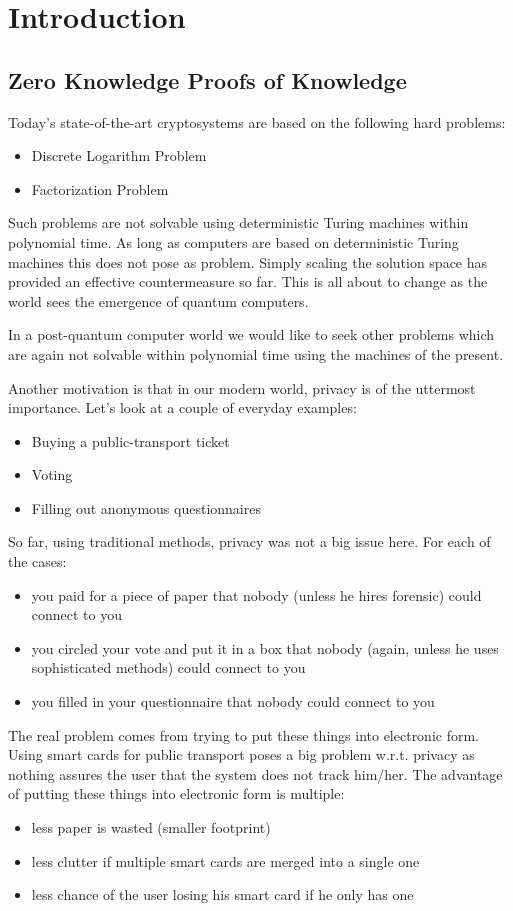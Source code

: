 \chapter{Introduction}

\section{Zero Knowledge Proofs of Knowledge}

Today's state-of-the-art cryptosystems are based on the following hard problems:
\begin{itemize}
\item Discrete Logarithm Problem
\item Factorization Problem
\end{itemize}

Such problems are not solvable using deterministic Turing machines
within polynomial time.  As long as computers are based on
deterministic Turing machines this does not pose as problem.  Simply
scaling the solution space has provided an effective countermeasure so
far. This is all about to change as the world sees the emergence of
quantum computers.

In a post-quantum computer world we would like to seek other problems
which are again not solvable within polynomial time using the machines
of the present.

Another motivation is that in our modern world, privacy is of the
uttermost importance. Let's look at a couple of everyday examples:
\begin{itemize}
\item Buying a public-transport ticket
\item Voting
\item Filling out anonymous questionnaires
\end{itemize}

So far, using traditional methods, privacy was not a big issue here. For
each of the cases:
\begin{itemize}
\item you paid for a piece of paper that nobody (unless he hires
  forensic) could connect to you
\item you circled your vote and put it in a box that nobody (again,
  unless he uses sophisticated methods) could connect to you
\item you filled in your questionnaire that nobody could connect to
  you
\end{itemize}

The real problem comes from trying to put these things into electronic
form. Using smart cards for public transport poses a big problem
w.r.t. privacy as nothing assures the user that the system does not
track him/her. The advantage of putting these things into electronic
form is multiple:
\begin{itemize}
\item less paper is wasted (smaller footprint)
\item less clutter if multiple smart cards are merged into a single
  one
\item less chance of the user losing his smart card if he only has one
\end{itemize}

